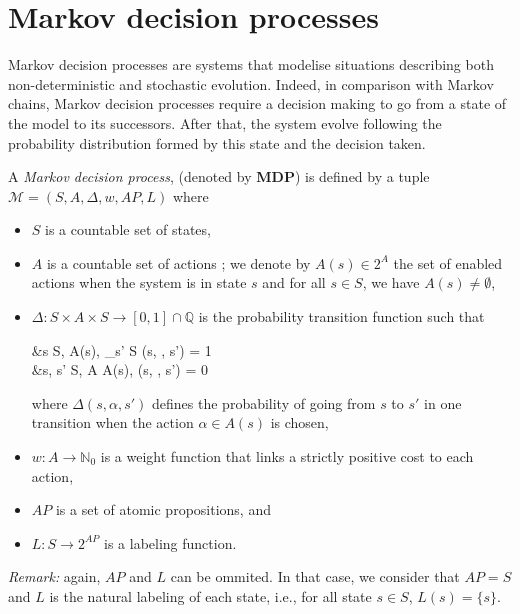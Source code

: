 \section{Markov decision processes}
Markov decision processes are systems that modelise situations describing both non-deterministic and stochastic evolution. Indeed, in comparison with Markov chains, Markov decision processes require a decision making to go from a state of the model to its successors. After that, the system evolve following the probability distribution formed by this state and the decision taken.

\begin{definition}
	A \textit{Markov decision process}, (denoted by \textbf{MDP}) is defined by a tuple $\mathcal{M}  = (S, A, \Delta, w, AP, L)$ where
	\begin{itemize}
		\item $S$ is a countable set of states,
		\item $A$ is a countable set of actions ; we denote by $A(s) \in 2^A$  the set of enabled actions when the system is in state $s$ and for all $s \in S$,
    we have $A(s) \neq \emptyset$,
		\item $\Delta: S \times A \times S \rightarrow [0, 1] \cap \mathbb{Q}$ is the probability transition function such that
		\begin{flalign*}
			&\forall s \in S, \; \forall \alpha \in A(s), \; \sum_{s' \in S} \Delta(s, \alpha, s') = 1 \\
			 &\forall s, s' \in S, \; \forall \alpha \in A \setminus A(s), \; \Delta(s, \alpha, s') = 0
		\end{flalign*}

			where $\Delta(s, \alpha, s')$ defines the probability of going from $s$ to $s'$ in one transition when the action $\alpha \in A(s)$ is chosen,
    \item $w: A \rightarrow \mathbb{N}_0$ %
      is a weight function that links a strictly positive cost to each action,
    \item $AP$ is a set of atomic propositions, and
    \item $L: S \rightarrow 2^{AP}$ is a labeling function.
	\end{itemize}
  \textit{Remark: }again, $AP$ and $L$ can be ommited. In that case, we consider that $AP=S$ and $L$ is the natural labeling of each state, i.e., for all state $s \in S$, $L(s) = \{s\}$.
\end{definition}

